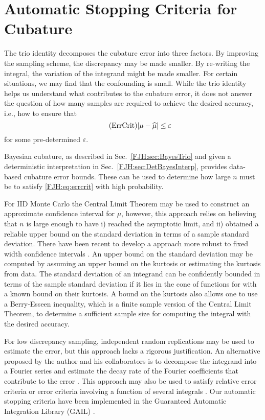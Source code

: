 \documentclass[graybox,footinfo]{svmult}
\begin{document}
\begin{FJHLesson}
	\FJHLessonThirteen
\end{FJHLesson}

\section{Automatic Stopping Criteria for Cubature}
The trio identity decomposes the cubature error into three factors.  By improving the 
sampling scheme, the discrepancy may be made smaller.  By re-writing the integral, the 
variation of the integrand might be made smaller.  For certain situations, we may find that 
the confounding is small.  While the trio identity helps us understand what contributes to 
the cubature error, it does not answer the question of how many samples are 
required to achieve the desired accuracy, i.e., how to ensure that 
\begin{equation} \label{FJH:eq:errcrit} \tag{ErrCrit}
\lvert \mu - \hmu \rvert \le \varepsilon
\end{equation}
for some pre-determined $\varepsilon$.

Bayesian cubature, as described in Sec.\ \ref{FJH:sec:BayesTrio} and given a 
deterministic interpretation in Sec.\ \ref{FJH:sec:DetBayesInterp}, provides data-based 
cubature
error bounds.  These can be used to determine how large $n$ must be to satisfy 
\eqref{FJH:eq:errcrit} with high probability.

For IID Monte Carlo the Central Limit Theorem may be used to construct an approximate 
confidence interval for $\mu$, however, this approach relies on believing that $n$ is 
large enough to have i) reached the asymptotic limit, and ii) obtained a reliable upper 
bound on the standard deviation in terms of a sample standard deviation.  There have 
been recent to develop a approach more robust to fixed width confidence intervals 
\cite{BayEtal14a,HicEtal14a,Jia16a}.  An 
upper bound on the standard deviation may be computed by assuming an upper bound 
on the kurtosis or estimating the kurtosis from data.  The standard 
deviation of an integrand can be confidently bounded in terms of the sample standard 
deviation if it lies in the cone of functions for with a known bound on their kurtosis.
A bound on 
the kurtosis also allows one to use a Berry-Esseen inequality, which is a finite sample version 
of  the Central Limit Theorem, to determine a sufficient sample size for computing the integral 
with the desired accuracy.

For low discrepancy sampling, independent random replications may be used to estimate 
the error, but this approach lacks a rigorous justification.  An alternative proposed by the 
author and his collaborators is to decompose the integrand into a Fourier series and 
estimate the decay rate of the Fourier coefficients that contribute to the error
\cite{HicJim16a,HicEtal17a,JimHic16a}.  This approach may also be used to satisfy 
relative error criteria or error criteria involving a function of several integrals  
\cite{HicEtal17a}.  Our automatic stopping criteria have been 
implemented in the Guaranteed Automatic Integration Library (GAIL) \cite{ChoEtal15a}.
\end{document}
